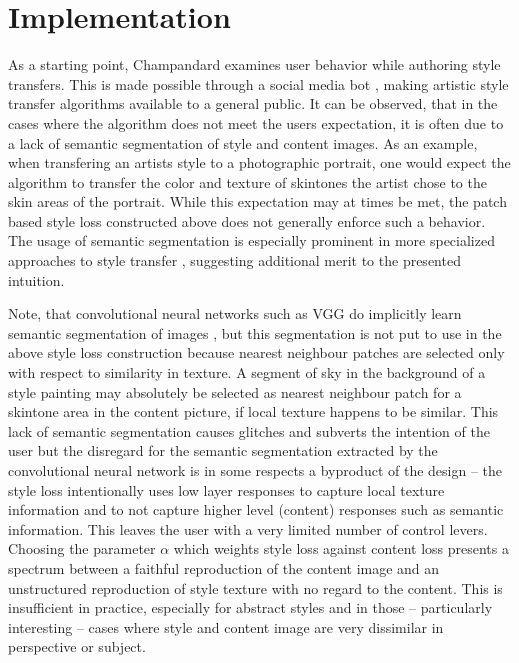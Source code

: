 
\section{Implementation}
\label{section:implementation}

As a starting point, Champandard examines user behavior while authoring style transfers. This is made possible through a social media bot \cite{deepforger2015}, making artistic style transfer algorithms available to a general public. It can be observed, that in the cases where the algorithm does not meet the users expectation, it is often due to a lack of semantic segmentation of style and content images. As an example, when transfering an artists style to a photographic portrait, one would expect the algorithm to transfer the color and texture of skintones the artist chose to the skin areas of the portrait. While this expectation may at times be met, the patch based style loss constructed above does not generally enforce such a behavior. The usage of semantic segmentation is especially prominent in more specialized approaches to style transfer \cite{yang2017semantic}, suggesting additional merit to the presented intuition.

Note, that convolutional neural networks such as VGG do implicitly learn semantic segmentation of images \cite{thoma2016survey}, but this segmentation is not put to use in the above style loss construction because nearest neighbour patches are selected only with respect to similarity in texture. A segment of sky in the background of a style painting may absolutely be selected as nearest neighbour patch for a skintone area in the content picture, if local texture happens to be similar. This lack of semantic segmentation causes glitches and subverts the intention of the user but the disregard for the semantic segmentation extracted by the convolutional neural network is in some respects a byproduct of the design -- the style loss intentionally uses low layer responses to capture local texture information and to not capture higher level (content) responses such as semantic information. This leaves the user with a very limited number of control levers. Choosing the parameter \(\alpha\) which weights style loss against content loss presents a spectrum between a faithful reproduction of the content image and an unstructured reproduction of style texture with no regard to the content. This is insufficient in practice, especially for abstract styles and in those -- particularly interesting -- cases where style and content image are very dissimilar in perspective or subject.

